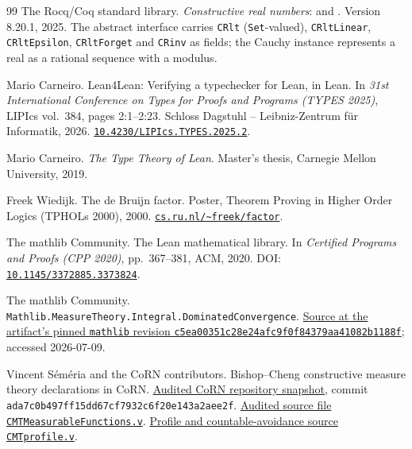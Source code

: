 \documentclass[11pt]{article}
\theoremstyle{definition}
\theoremstyle{remark}
\newcommand{\doi}[1]{\href{https://doi.org/#1}{\texttt{#1}}}
\begin{document}
\begin{thebibliography}{99}
The {Rocq}/{Coq} standard library.
\newblock \emph{Constructive real numbers}: 
  and .
\newblock Version 8.20.1, 2025.  The abstract interface carries \texttt{CRlt} (\texttt{Set}-valued),
  \texttt{CRltLinear}, \texttt{CRltEpsilon}, \texttt{CRltForget} and \texttt{CRinv}
  as fields; the Cauchy instance represents a real as a rational sequence with a
  modulus.

Mario Carneiro.
\newblock Lean4Lean: Verifying a typechecker for {Lean}, in {Lean}.
\newblock In \emph{31st International Conference on Types for Proofs and Programs
  (TYPES 2025)}, LIPIcs vol.~384, pages 2:1--2:23. Schloss Dagstuhl --
  Leibniz-Zentrum f\"ur Informatik, 2026. \doi{10.4230/LIPIcs.TYPES.2025.2}.

Mario Carneiro.
\newblock \emph{The Type Theory of Lean}.
\newblock Master's thesis, Carnegie Mellon University, 2019.

Freek Wiedijk.
\newblock The de Bruijn factor.
\newblock Poster, Theorem Proving in Higher Order Logics (TPHOLs 2000), 2000.
\newblock \href{https://www.cs.ru.nl/~freek/factor/}{\texttt{cs.ru.nl/\textasciitilde freek/factor}}.

The mathlib Community.
\newblock The Lean mathematical library.
\newblock In \emph{Certified Programs and Proofs (CPP 2020)}, pp.~367--381, ACM, 2020.
\newblock DOI: \doi{10.1145/3372885.3373824}.

The mathlib Community.
\newblock \texttt{Mathlib.MeasureTheory.Integral.DominatedConvergence}.
\newblock \href{https://github.com/leanprover-community/mathlib4/blob/c5ea00351c28e24afc9f0f84379aa41082b1188f/Mathlib/MeasureTheory/Integral/DominatedConvergence.lean}{Source at the artifact's pinned \texttt{mathlib} revision
\texttt{c5ea00351c28e24afc9f0f84379aa41082b1188f}}; accessed 2026-07-09.

Vincent S\'em\'eria and the CoRN contributors.
\newblock Bishop--Cheng constructive measure theory declarations in CoRN.
\newblock \href{https://github.com/rocq-community/corn/tree/ada7c0b497ff15dd67cf7932c6f20e143a2aee2f}{Audited CoRN repository snapshot}, commit \texttt{ada7c0b497ff15dd67cf7932c6f20e143a2aee2f}.
\newblock \href{https://github.com/rocq-community/corn/blob/ada7c0b497ff15dd67cf7932c6f20e143a2aee2f/reals/stdlib/CMTMeasurableFunctions.v}{Audited source file \texttt{CMTMeasurableFunctions.v}}.
\newblock \href{https://github.com/rocq-community/corn/blob/ada7c0b497ff15dd67cf7932c6f20e143a2aee2f/reals/stdlib/CMTprofile.v}{Profile and countable-avoidance source \texttt{CMTprofile.v}}.


\end{thebibliography}
\end{document}
